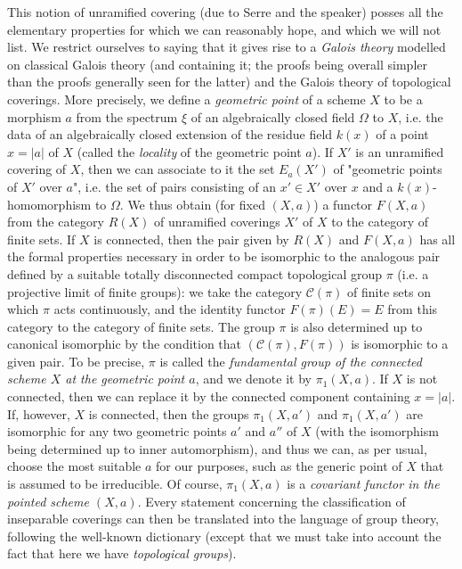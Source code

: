 This notion of unramified covering (due to Serre and the speaker) posses all the elementary properties for which we can reasonably hope, and which we will not list.
We restrict ourselves to saying that it gives rise to a \emph{Galois theory} modelled on classical Galois theory (and containing it; the proofs being overall simpler than the proofs generally seen for the latter) and the Galois theory of topological coverings.
More precisely, we define a \emph{geometric point} of a scheme $X$ to be a morphism $a$ from the spectrum $\xi$ of an algebraically closed field $\Omega$ to $X$, i.e. the data of an algebraically closed extension of the residue field $k(x)$ of a point $x=|a|$ of $X$ (called the \emph{locality} of the geometric point $a$).
If $X'$ is an unramified covering of $X$, then we can associate to it the set $E_a(X')$ of "geometric points of $X'$ over $a$", i.e. the set of pairs consisting of an $x'\in X'$ over $x$ and a $k(x)$-homomorphism to $\Omega$.
We thus obtain (for fixed $(X,a)$) a functor $F(X,a)$ from the category $R(X)$ of unramified coverings $X'$ of $X$ to the category of finite sets.
If $X$ is connected, then the pair given by $R(X)$ and $F(X,a)$ has all the formal properties necessary in order to be isomorphic to the analogous pair defined by a suitable totally disconnected compact topological group $\pi$ (i.e. a projective limit of finite groups): we take the category $\mathcal{C}(\pi)$ of finite sets on which $\pi$ acts continuously, and the identity functor $F(\pi)(E)=E$ from this category to the category of finite sets.
The group $\pi$ is also determined up to canonical isomorphic by the condition that $(\mathcal{C}(\pi),F(\pi))$ is isomorphic to a given pair.
To be precise, $\pi$ is called the \emph{fundamental group of the connected scheme $X$ at the geometric point $a$}, and we denote it by $\pi_1(X,a)$.
If $X$ is not connected, then we can replace it by the connected component containing $x=|a|$.
If, however, $X$ is connected, then the groups $\pi_1(X,a')$ and $\pi_1(X,a')$ are isomorphic for any two geometric points $a'$ and $a''$ of $X$ (with the isomorphism being determined up to inner automorphism), and thus we can, as per usual, choose the most suitable $a$ for our purposes, such as the generic point of $X$ that is assumed to be irreducible.
Of course, $\pi_1(X,a)$ is a \emph{covariant functor in the pointed scheme $(X,a)$}.
Every statement concerning the classification of inseparable coverings can then be translated into the language of group theory, following the well-known dictionary (except that we must take into account the fact that here we have \emph{topological groups}).



